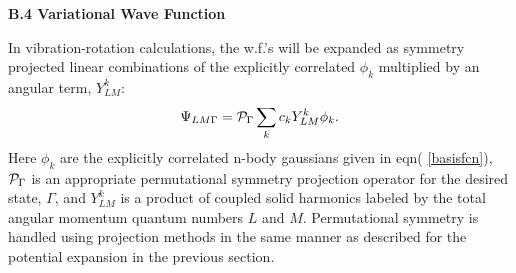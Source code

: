 
\vspace{2mm}
\noindent
{\bf B.4 Variational Wave Function}

In vibration-rotation calculations,
the w.f.'s will be
expanded as symmetry projected linear combinations of the explicitly
correlated $\phi _k$ multiplied by an angular term, $Y_{LM}^k:$ 
\begin{equation}
\Psi_{LM\Gamma }={\cal P}_\Gamma \sum_k c_k Y_{LM}^k\phi_k.  \label{wf}
\label{Y1}
\end{equation}
Here $\phi _k$ are the explicitly correlated n-body gaussians given 
in eqn(%
\ref{basisfcn}), ${\cal P}_\Gamma $ is an appropriate permutational
symmetry projection operator for the desired state, 
$\Gamma $, and $Y_{LM}^k$
is a product of coupled solid harmonics labeled by the total angular
momentum quantum numbers $L$ and $M$.
Permutational symmetry is handled using projection methods in the same
manner as described for the potential expansion in the previous section.

